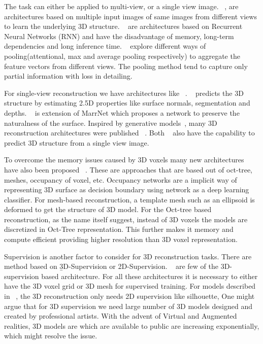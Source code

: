 The task can either be applied to \b{multi-view, or a single view image}.
~\cite{Kar2017LearningAM, choy20163d, Yang_2019, huang2018deepmvs, Paschalidou2018RayNetLV, Xie_2019, Xie_2020}, are architectures based on multiple input images of same images from different views to learn the underlying 3D structure.
~\cite{Kar2017LearningAM, choy20163d} are architectures based on Recurrent Neural Networks (RNN) and have the disadvantage of memory, long-term dependencies and long inference time.
~\cite{Yang_2019, huang2018deepmvs, Paschalidou2018RayNetLV} explore different ways of pooling(attentional, max and average pooling respectively) to aggregate the feature vectors from different views.
The pooling method tend to capture only partial information with loss in detailing.

For single-view reconstruction we have architectures like ~\cite{wu2017marrnet,z-gan, Yang_219, wu2018learning, popov2020corenet}.
~\cite{wu2017marrnet} predicts the 3D structure by estimating 2.5D properties like surface normals, segmentation and depths.
~\cite{wu2018learning} is extension of MarrNet which proposes a network to preserve the naturalness of the surface.
Inspired by generative models~\cite{Goodfellow2014GenerativeAN,kingma2014autoencoding}, many 3D reconstruction architectures were published ~\cite{z-gan, Yang_219,wu2017learning,Lunz2020InverseGG}.
Both ~\cite{Xie_2019, Xie_2020} also have the capability to predict 3D structure from a single view image.

To overcome the memory issues caused by 3D voxels many new architectures have also been proposed
~\cite{tatarchenko2017octree,Richter2018MatryoshkaNP,Mescheder2019OccupancyNL,Gkioxari2019MeshR, wang2018pixel2mesh,groueix2018atlasnet,pan2019deep}.
These are approaches that are based out of oct-tree, meshes, occupancy of voxel, etc.
Occupancy networks are a implicit way of representing 3D surface as decision boundary using network as a deep learning classifier.
For mesh-based reconstruction, a template mesh such as an ellipsoid is deformed to get the structure of 3D model.
For the Oct-tree based reconstruction, as the name itself suggest, instead of 3D voxels the models are discretized in Oct-Tree representation.
This further makes it memory and compute efficient providing higher resolution than 3D voxel representation.

Supervision is another factor to consider for 3D reconstruction tasks.
There are method based on \b{3D-Supervision or 2D-Supervision}.
~\cite{Xie_2019,Xie_2020,wu2017marrnet,groueix2018atlasnet,pan2019deep, chen2019learning} are few of the 3D-supervision based architecture.
For all these architectures it is necessary to either have the 3D voxel grid or 3D mesh for supervised training.
For models described in ~\cite{Lunz2020InverseGG,henderson2019learning}, the 3D reconstruction only needs 2D supervision like silhouette,
One might argue that for 3D supervision we need large number of 3D models designed and created by professional artists.
With the advent of Virtual and Augmented realities, 3D models are which are available to public are increasing exponentially, which might resolve the issue.


